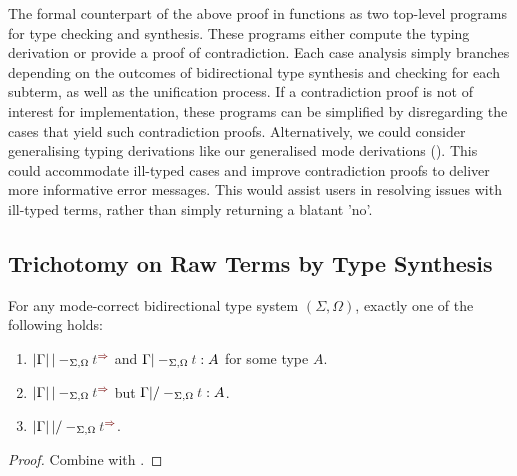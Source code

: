 The formal counterpart of the above proof in \Agda functions as two top-level programs for type checking and synthesis.
These programs either compute the typing derivation or provide a proof of contradiction.
Each case analysis simply branches depending on the outcomes of bidirectional type synthesis and checking for each subterm, as well as the unification process.
If a contradiction proof is not of interest for implementation, these programs can be simplified by disregarding the cases that yield such contradiction proofs.
Alternatively, we could consider generalising typing derivations like our generalised mode derivations ().
This could accommodate ill-typed cases and improve contradiction proofs to deliver more informative error messages.
This would assist users in resolving issues with ill-typed terms, rather than simply returning a blatant 'no'.

\subsection{Trichotomy on Raw Terms by Type Synthesis} \label{subsec:trichotomy}

\begin{corollary}\label{cor:trichotomy}
  For any mode-correct bidirectional type system $(\Sigma, \Omega)$, 
  exactly one of the following holds:
  \begin{enumerate}
    \item $\erase{\Gamma} |-_{\Sigma, \Omega} \isTerm{t}^{\syn}$ and\/ $\Gamma |-_{\Sigma, \Omega} \isTerm{t} : A$ for some type $A$.
    \item $\erase{\Gamma} |-_{\Sigma, \Omega} \isTerm{t}^{\syn}$ but\/ $\Gamma |/-_{\Sigma, \Omega} \isTerm{t} : A$.
    \item $\erase{\Gamma} |/-_{\Sigma, \Omega} \isTerm{t}^{\syn}$.
  \end{enumerate}
\end{corollary}
\begin{proof}
  Combine  with .
  
\end{proof}
